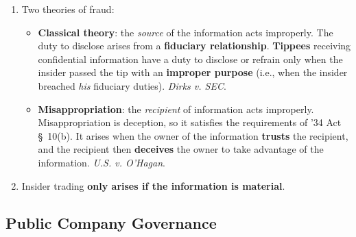 \begin{enumerate}
\begin{enumerate}
\begin{enumerate}
{            investing} in the securities concerned. Information is 
            \textbf{material} if it would have a \textbf{substantial effect on 
            the market price of the security}.\footnote{Casebook p. 471.} 
            \emph{SEC v. Texas Gulf Sulphur Co.} (the misleading press release 
            case, holding that the information was material). %
            \item Two theories of fraud:
            \begin{itemize}
                \item \textbf{Classical theory}: the \emph{source} of the 
                information acts improperly. The duty to disclose arises from 
                a \textbf{fiduciary relationship}. \textbf{Tippees} receiving 
                confidential information have a duty to disclose or refrain only when the 
                insider passed the tip with an \textbf{improper purpose} 
                (i.e., when the insider breached \emph{his} fiduciary duties).  
                \emph{Dirks v. SEC}.
                \item \textbf{Misappropriation}: the \emph{recipient} of 
                information acts improperly. Misappropriation is deception, so 
                it satisfies the requirements of '34 Act \S\ 10(b). It arises 
                when the owner of the information \textbf{trusts} the 
                recipient, and the recipient then \textbf{deceives} the owner 
                to take advantage of the information.  \emph{U.S. v. O'Hagan}. 
            \end{itemize}
            \item Insider trading \textbf{only arises if the information is 
            material}.
        \end{enumerate}
    \end{enumerate}
\end{enumerate}



\newpage

\subsection{Public Company Governance}


